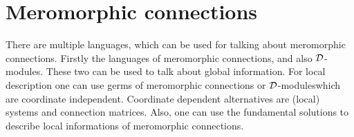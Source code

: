 \chapter{Meromorphic connections}
\begin{comment}
  \begin{multicols}{2}
    \textbf{Global}
    \begin{itemize}
      \item Meromorphic connection
      \item $\cD$-modules (global)
    \end{itemize}
    \columnbreak
    \textbf{Local}
    \begin{itemize}
      \item Germ of a meromorphic connection
      \item $\cD$-modules (local)
      \item System
        \begin{itemize}
          \item coordinate dependent
        \end{itemize}
      \item Conection matrix
        \begin{itemize}
          \item coordinate dependent
        \end{itemize}
    \end{itemize}
  \end{multicols}
\end{comment}
There are multiple languages, which can be used for talking about meromorphic
connections. Firstly the languages of meromorphic connections, and also
$\mathcal{D}$-modules\TODO[global]. These two can be used to talk about global
information. For local description one can use germs of meromorphic connections
or $\mathcal{D}$-modules\TODO[local] which are coordinate independent. Coordinate
dependent alternatives are (local) systems and connection matrices. Also, one
can use the fundamental solutions to describe local informations of meromorphic
connections.
\begin{comment}
  Siehe:
  \begin{multicols}{3}
    \begin{itemize}
      \item \cite{boalch} and \cite{thboalch}
      \item \cite{sabbah2007isomonodromic}
    \end{itemize}
    \columnbreak
    \begin{itemize}
      \item \cite{Varadarajan96linearmeromorphic}
    \end{itemize}
    \columnbreak
    \begin{itemize}
      \item \cite{Loday1994}
      \item \cite{Loday2014}
    \end{itemize}
  \end{multicols}
\end{comment}

